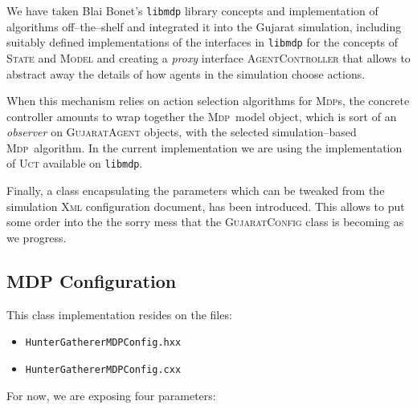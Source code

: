 \documentclass[a4paper,10pt]{article}
\newcommand{\mdp}{\textsc{Mdp}}
\newcommand{\mdps}{\textsc{Mdp}s}
\begin{document}
We have taken Blai Bonet's \texttt{libmdp} library concepts and implementation of algorithms off--the--shelf and 
integrated it into the Gujarat simulation, including suitably defined implementations of the interfaces 
in \texttt{libmdp} for the concepts of \textsc{State} and \textsc{Model} and creating a \emph{proxy} interface
\textsc{AgentController} that allows to abstract away the details of how agents in the simulation choose actions.

When this mechanism relies on action selection algorithms for \mdps, the concrete controller amounts to wrap together
the \mdp~model object, which is sort of an \emph{observer} on \textsc{GujaratAgent} objects, with the selected
simulation--based \mdp~algorithm. In the current implementation we are using the implementation of \textsc{Uct} available
on \texttt{libmdp}.

Finally, a class encapsulating the parameters which can be tweaked from the simulation \textsc{Xml} configuration
document, has been introduced. This allows to put some order into the the sorry mess that the \textsc{GujaratConfig}
class is becoming as we progress.

\subsection{MDP Configuration}

This class implementation resides on the files:
\begin{itemize}
\item \texttt{HunterGathererMDPConfig.hxx}
\item \texttt{HunterGathererMDPConfig.cxx}
\end{itemize}

For now, we are exposing four parameters:
\end{document}
